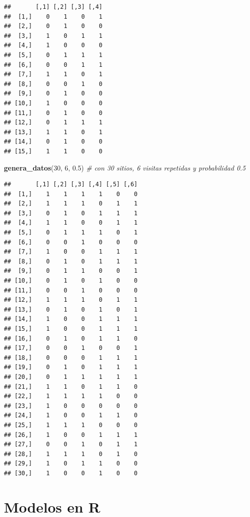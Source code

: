 \documentclass[
]{book}
\newenvironment{Shaded}{\begin{snugshade}}{\end{snugshade}}
\newcommand{\CommentTok}[1]{\textcolor[rgb]{0.56,0.35,0.01}{\textit{#1}}}
\newcommand{\DecValTok}[1]{\textcolor[rgb]{0.00,0.00,0.81}{#1}}
\newcommand{\FloatTok}[1]{\textcolor[rgb]{0.00,0.00,0.81}{#1}}
\newcommand{\KeywordTok}[1]{\textcolor[rgb]{0.13,0.29,0.53}{\textbf{#1}}}
\newcommand{\NormalTok}[1]{#1}
\begin{document}
\begin{verbatim}
##       [,1] [,2] [,3] [,4]
##  [1,]    0    1    0    1
##  [2,]    0    1    0    0
##  [3,]    1    0    1    1
##  [4,]    1    0    0    0
##  [5,]    0    1    1    1
##  [6,]    0    0    1    1
##  [7,]    1    1    0    1
##  [8,]    0    0    1    0
##  [9,]    0    1    0    0
## [10,]    1    0    0    0
## [11,]    0    1    0    0
## [12,]    0    1    1    1
## [13,]    1    1    0    1
## [14,]    0    1    0    0
## [15,]    1    1    0    0
\end{verbatim}

\begin{Shaded}
\begin{Highlighting}[]
\KeywordTok{genera_datos}\NormalTok{(}\DecValTok{30}\NormalTok{, }\DecValTok{6}\NormalTok{, }\FloatTok{0.5}\NormalTok{) }\CommentTok{# con 30 sitios, 6 visitas repetidas y probabilidad 0.5}
\end{Highlighting}
\end{Shaded}

\begin{verbatim}
##       [,1] [,2] [,3] [,4] [,5] [,6]
##  [1,]    1    1    1    1    0    0
##  [2,]    1    1    1    0    1    1
##  [3,]    0    1    0    1    1    1
##  [4,]    1    1    0    0    1    1
##  [5,]    0    1    1    1    0    1
##  [6,]    0    0    1    0    0    0
##  [7,]    1    0    0    1    1    1
##  [8,]    0    1    0    1    1    1
##  [9,]    0    1    1    0    0    1
## [10,]    0    1    0    1    0    0
## [11,]    0    0    1    0    0    0
## [12,]    1    1    1    0    1    1
## [13,]    0    1    0    1    0    1
## [14,]    1    0    0    1    1    1
## [15,]    1    0    0    1    1    1
## [16,]    0    1    0    1    1    0
## [17,]    0    0    1    0    0    1
## [18,]    0    0    0    1    1    1
## [19,]    0    1    0    1    1    1
## [20,]    0    1    1    1    1    1
## [21,]    1    1    0    1    1    0
## [22,]    1    1    1    1    0    0
## [23,]    1    0    0    0    0    0
## [24,]    1    0    0    1    1    0
## [25,]    1    1    1    0    0    0
## [26,]    1    0    0    1    1    1
## [27,]    0    0    1    0    1    1
## [28,]    1    1    1    0    1    0
## [29,]    1    0    1    1    0    0
## [30,]    1    0    0    1    0    0
\end{verbatim}

\hypertarget{modelos-en-r}{%
\chapter{Modelos en R}\label{modelos-en-r}}
\end{document}
